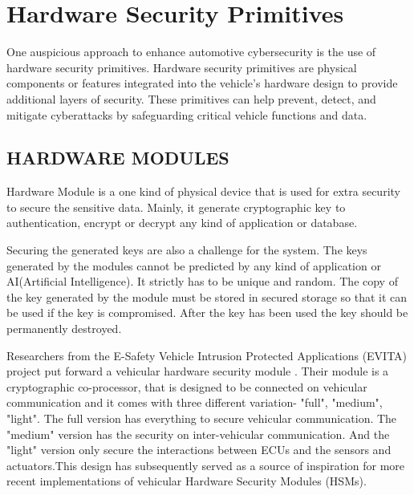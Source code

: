 \documentclass[conference]{IEEEtran}
\begin{document}
\section{Hardware Security Primitives}
One auspicious approach to enhance automotive cybersecurity is the use of hardware security primitives. Hardware security primitives are physical components or features integrated into the vehicle's hardware design to provide additional layers of security. These primitives can help prevent, detect, and mitigate cyberattacks by safeguarding critical vehicle functions and data.
\subsection{HARDWARE MODULES}
Hardware Module is a one kind of physical device that is used for extra security to secure the sensitive data. Mainly, it generate cryptographic key to authentication, encrypt or decrypt any kind of application or database. \par
Securing the generated keys are also a challenge for the system. The keys generated by the modules cannot be predicted by any kind of application or AI(Artificial Intelligence). It strictly has to be unique and random. The copy of the key generated by the module must be stored in secured storage so that it can be used if the key is compromised. After the key has been used the key should be permanently destroyed.\par
Researchers from the E-Safety Vehicle Intrusion
Protected Applications (EVITA) project put forward a vehicular hardware security module .\cite{wolf2012design}
Their module is a cryptographic co-processor, that is designed to be connected on vehicular communication and it comes with three different variation- "full", "medium", "light". The full version has everything to secure vehicular communication. The "medium" version has the security on inter-vehicular communication. And the "light" version only secure the interactions between ECUs and the sensors and actuators.This design has subsequently served as a source of inspiration for more recent implementations of vehicular Hardware Security Modules (HSMs). 
\end{document}
